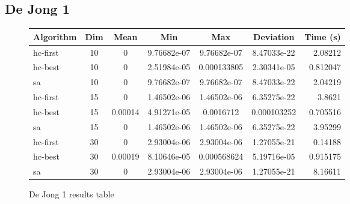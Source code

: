 \documentclass{article}
\begin{document}
    \subsection{De Jong 1}
        \begin{figure}[H]
            \centering
            \begin{tabular}{|l|c|c|c|c|c|r|}
                \hline Algorithm & Dim & Mean & Min & Max & Deviation & Time (s) \\
                \hline hc-first & 10 & 0 & 9.76682e-07 & 9.76682e-07 & 8.47033e-22 & 2.08212 \\
                \hline hc-best & 10 & 0 & 2.51984e-05 & 0.000133805 & 2.30341e-05 & 0.812047 \\
                \hline sa & 10 & 0 & 9.76682e-07 & 9.76682e-07 & 8.47033e-22 & 2.04219 \\
                \hline hc-first & 15 & 0 & 1.46502e-06 & 1.46502e-06 & 6.35275e-22 & 3.8621 \\
                \hline hc-best & 15 & 0.00014 & 4.91271e-05 & 0.0016712 & 0.000103252 & 0.705516 \\
                \hline sa & 15 & 0 & 1.46502e-06 & 1.46502e-06 & 6.35275e-22 & 3.95299 \\
                \hline hc-first & 30 & 0 & 2.93004e-06 & 2.93004e-06 & 1.27055e-21 & 0.14188 \\
                \hline hc-best & 30 & 0.00019 & 8.10646e-05 & 0.000568624 & 5.19716e-05 & 0.915175 \\
                \hline sa & 30 & 0 & 2.93004e-06 & 2.93004e-06 & 1.27055e-21 & 8.16611 \\\hline
            \end{tabular}
            \caption{De Jong 1 results table}
        \end{figure}
\end{document}
